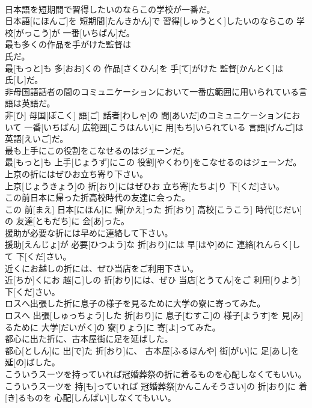 \documentclass[8pt]{extreport}
\begin{document}
\begin{CJK}{UTF8}{min}
\\	日本語を短期間で習得したいのならこの学校が一番だ。	
\\	日本語[にほんご]を 短期間[たんきかん]で 習得[しゅうとく]したいのならこの 学校[がっこう]が 一番[いちばん]だ。
\\	最も多くの作品を手がけた監督は
\\	氏だ。	
\\	最[もっと]も 多[おお]くの 作品[さくひん]を 手[て]がけた 監督[かんとく]は 
\\	氏[し]だ。
\\	非母国語話者の間のコミュニケーションにおいて一番広範囲に用いられている言語は英語だ。	
\\	非[ひ] 母国[ぼこく] 語[ご] 話者[わしゃ]の 間[あいだ]のコミュニケーションにおいて 一番[いちばん] 広範囲[こうはんい]に 用[もち]いられている 言語[げんご]は 英語[えいご]だ。
\\	最も上手にこの役割をこなせるのはジェーンだ。	
\\	最[もっと]も 上手[じょうず]にこの 役割[やくわり]をこなせるのはジェーンだ。
\\	上京の折にはぜひお立ち寄り下さい。	
\\	上京[じょうきょう]の 折[おり]にはぜひお 立ち寄[たちよ]り 下[くだ]さい。
\\	この前日本に帰った折高校時代の友達に会った。	
\\	この 前[まえ] 日本[にほん]に 帰[かえ]った 折[おり] 高校[こうこう] 時代[じだい]の 友達[ともだち]に 会[あ]った。
\\	援助が必要な折には早めに連絡して下さい。	
\\	援助[えんじょ]が 必要[ひつよう]な 折[おり]には 早[はや]めに 連絡[れんらく]して 下[くだ]さい。
\\	近くにお越しの折には、ぜひ当店をご利用下さい。	
\\	近[ちか]くにお 越[こ]しの 折[おり]には、ぜひ 当店[とうてん]をご 利用[りよう] 下[くだ]さい。
\\	ロスへ出張した折に息子の様子を見るために大学の寮に寄ってみた。	
\\	ロスへ 出張[しゅっちょう]した 折[おり]に 息子[むすこ]の 様子[ようす]を 見[み]るために 大学[だいがく]の 寮[りょう]に 寄[よ]ってみた。
\\	都心に出た折に、古本屋街に足を延ばした。	
\\	都心[としん]に 出[で]た 折[おり]に、 古本屋[ふるほんや] 街[がい]に 足[あし]を 延[の]ばした。
\\	こういうスーツを持っていれば冠婚葬祭の折に着るものを心配しなくてもいい。	
\\	こういうスーツを 持[も]っていれば 冠婚葬祭[かんこんそうさい]の 折[おり]に 着[き]るものを 心配[しんぱい]しなくてもいい。

\end{CJK}
\end{document}
